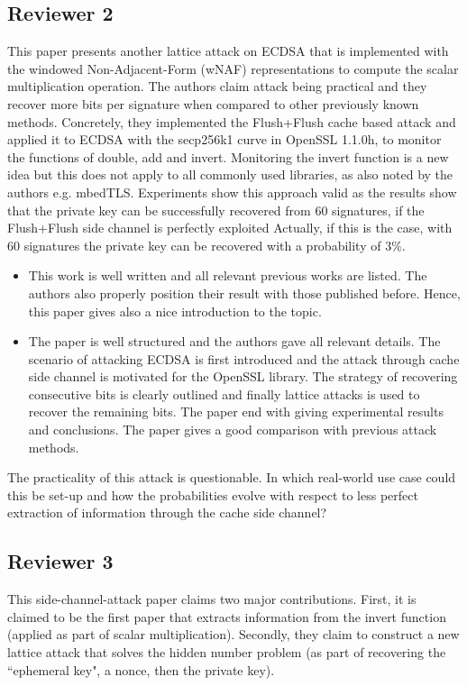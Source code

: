 \subsection{Reviewer 2}
This paper presents another lattice attack on ECDSA that is implemented with the windowed Non-Adjacent-Form (wNAF) representations to compute the scalar multiplication operation. 
The authors claim attack being practical and they recover more bits per signature when compared to other previously known methods.
Concretely, they implemented the Flush+Flush cache based attack and applied it to ECDSA with the secp256k1 curve in OpenSSL 1.1.0h, to monitor the functions of double, add and invert.
Monitoring the invert function is a new idea but this does not apply to all commonly used libraries, as also noted by the authors e.g. mbedTLS.
Experiments show this approach valid as the results show that the private key can be successfully recovered from $60$ signatures, if the Flush+Flush side channel is perfectly exploited
Actually, if this is the case, with $60$ signatures the private key can be recovered with a probability of $3\%$.

\begin{itemize}
\item This work is well written and all relevant previous works are listed. The authors also properly position their result with those published before. Hence, this paper gives also a nice introduction to the topic.
\item The paper is well structured and the authors gave all relevant details. The scenario of attacking ECDSA is first introduced and the attack through cache side channel is motivated for the OpenSSL library. The strategy of recovering consecutive bits is clearly outlined and finally lattice attacks is used to recover the remaining bits. The paper end with giving experimental results and conclusions. The paper gives a good comparison with previous attack methods.
\end{itemize}

The practicality of this attack is questionable. In which real-world use case could this be set-up and how the probabilities evolve with respect to less perfect extraction of information through the cache side channel?

\subsection{Reviewer 3}
This side-channel-attack paper claims two major contributions. First, it is claimed to be the first paper that extracts information from the invert function (applied as part of scalar multiplication). 
Secondly, they claim to construct a new lattice attack that solves the hidden number problem (as part of recovering the ``ephemeral key", a nonce, then the private key). 

